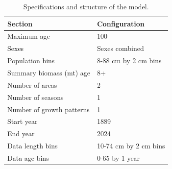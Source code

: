 \documentclass[
]{scrartcl}
\begin{document}
\begin{longtable}{ll}

\caption{\label{tbl-model-config}Specifications and structure of the
model.}

\tabularnewline

\toprule
Section & Configuration \\ 
\midrule\addlinespace[2.5pt]
Maximum age & 100 \\ 
Sexes & Sexes combined \\ 
Population bins & 8-88 cm by 2 cm bins \\ 
Summary biomass (mt) age & 8+ \\ 
Number of areas & 2 \\ 
Number of seasons & 1 \\ 
Number of growth patterns & 1 \\ 
Start year & 1889 \\ 
End year & 2024 \\ 
Data length bins & 10-74 cm by 2 cm bins \\ 
Data age bins & 0-65 by 1 year \\ 
\bottomrule

\end{longtable}

\endgroup

\newpage{}

\begingroup
\fontsize{9.0pt}{10.8pt}\selectfont
\end{document}
